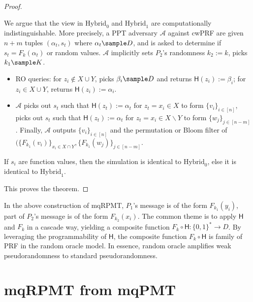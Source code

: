 \documentclass[a4paper,10pt]{article}
\begin{document}
\begin{proof}
\begin{trivlist}
We argue that the view in $\text{Hybrid}_0$ and $\text{Hybrid}_1$ are computationally indistinguishable. 
More precisely, a PPT adversary $\mathcal{A}$  against cwPRF 
are given $n+m$ tuples $(\alpha_t, s_t)$ where $\alpha_t \sample D$, 
and is asked to determine if $s_t = F_{k}(\alpha_t)$ or random values. 
$\mathcal{A}$ implicitly sets $P_2$'s randomness $k_2:=k$, picks $k_1 \sample K$. 
\begin{itemize}
    \item RO queries: for $z_i \notin X \cup Y$, picks $\beta_i \sample D$ and returns $\mathsf{H}(z_i):=\beta_i$; 
        for $z_i \in X \cup Y$, returns $\mathsf{H}(z_i) := \alpha_i$. 

    \item $\mathcal{A}$ picks out $s_t$ such that $\mathsf{H}(z_t):=\alpha_t$ for $z_t = x_i \in X$ 
        to form $\{v_i\}_{i \in [n]}$, 
        picks out $s_t$ such that $\mathsf{H}(z_t):=\alpha_t$ for $z_t = x_i \in X \backslash Y$ 
        to form $\{w_j\}_{j \in [n-m]}$. 
        Finally, $\mathcal{A}$ outputs $\{v_i\}_{i \in [n]}$ and the permutation or Bloom filter of 
        $(\{F_{k_1}(v_i)\}_{x_i \in X \cap Y}, \{F_{k_1}(w_j)\}_{j \in [n-m]}$.               
\end{itemize}

If $s_i$ are function values, then the simulation is identical to $\text{Hybrid}_0$, 
else it is identical to $\text{Hybrid}_1$. 
\end{trivlist}
This proves the theorem. 
\end{proof}

\begin{remark}
In the above construction of mqRPMT, $P_1$'s message is of the form $F_{k_1}(y_i)$, 
part of $P_2$'s message is of the form $F_{k_2}(x_i)$. 
The common theme is to apply $\mathsf{H}$ and $F_k$ in a cascade way, 
yielding a composite function $F_k \circ \mathsf{H}: \{0,1\}^* \rightarrow D$.   
By leveraging the programmability of $\mathsf{H}$, 
the composite function $F_k \circ \mathsf{H}$ is family of PRF in the random oracle model. 
In essence, random oracle amplifies weak pseudorandomness to standard pseudorandomness.  
\end{remark}


\section{mqRPMT from mqPMT}
\end{document}
